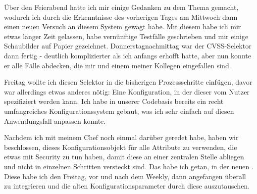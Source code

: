 
Über den Feierabend hatte ich mir einige Gedanken zu dem Thema gemacht, wodurch ich durch die Erkenntnisse des vorherigen Tages am Mittwoch dann einen neuen Versuch an diesem System gewagt habe.
Mit diesem habe ich mir etwas länger Zeit gelassen, habe vernünftige Testfälle geschrieben und mir einige Schaubilder auf Papier gezeichnet.
Donnerstagnachmittag war der CVSS-Selektor dann fertig - deutlich komplizierter als ich anfangs erhofft hatte, aber nun konnte er alle Fälle abdecken, die mir und einem meiner Kollegen eingefallen sind.


Freitag wollte ich diesen Selektor in die bisherigen Prozessschritte einfügen, davor war allerdings etwas anderes nötig:
Eine Konfiguration, in der dieser vom Nutzer spezifiziert werden kann.
Ich habe in unserer Codebasis bereits ein recht umfangreiches Konfigurationssystem gebaut, was ich sehr einfach auf diesen Anwendungsfall anpassen konnte.

Nachdem ich mit meinem Chef noch einmal darüber geredet habe, haben wir beschlossen, dieses Konfigurationsobjekt für alle Attribute zu verwenden, die etwas mit Security zu tun haben, damit diese an einer zentralen Stelle abliegen und nicht in einzelnen Schritten versteckt sind.
Das habe ich getan, in der neuen .
Diese habe ich den Freitag, vor und nach dem Weekly, dann angefangen überall zu integrieren und die alten Konfigurationsparameter durch diese auszutauschen.
